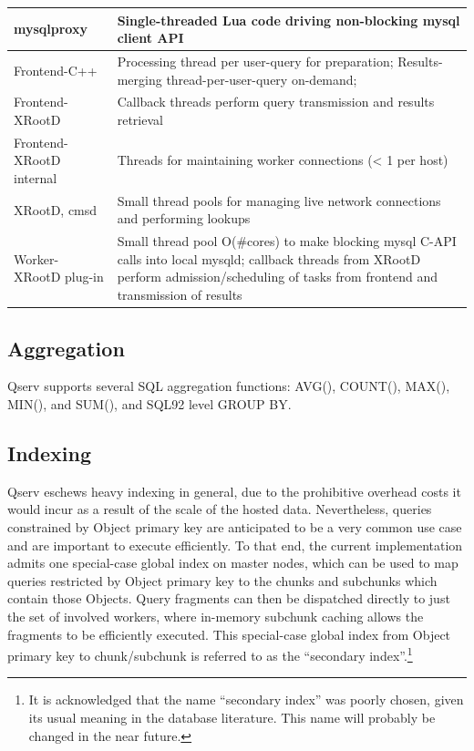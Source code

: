 \documentclass[DM,toc]{lsstdoc}
\begin{document}
\begin{longtable}{|l|p{}|}
\hline
mysqlproxy & Single-threaded Lua code driving non-blocking mysql client API \\ \hline
Frontend-C++ & Processing thread per user-query for preparation; Results-merging
thread-per-user-query on-demand; \\ \hline
Frontend-XRootD &
Callback threads perform query transmission and results retrieval \\ \hline
Frontend-XRootD internal &
Threads for maintaining worker connections (\textless{} 1 per
host) \\ \hline
XRootD, cmsd &
Small thread pools for managing live network connections and performing
lookups \\ \hline
Worker-XRootD plug-in &
Small thread pool O(\#cores) to make blocking mysql C-API calls into
local mysqld; callback threads from XRootD
perform admission/scheduling of tasks from frontend and transmission of
results \\ \hline
\hline
\end{longtable}

\subsection{Aggregation}\label{aggregation}

Qserv supports several SQL aggregation functions: AVG(), COUNT(), MAX(),
MIN(), and SUM(), and SQL92 level GROUP BY.

\subsection{Indexing}\label{indexing-1}

Qserv eschews heavy indexing in general, due to the prohibitive overhead costs
it would incur as a result of the scale of the hosted data. Nevertheless,
queries constrained by Object primary key are anticipated to be a very common
use case and are important to execute efficiently.  To that end, the current
implementation admits one special-case global index on master nodes, which can
be used to map queries restricted by Object primary key to the chunks and
subchunks which contain those Objects. Query fragments can then be dispatched
directly to just the set of involved workers, where in-memory subchunk caching
allows the fragments to be efficiently executed.  This special-case global
index from Object primary key to chunk/subchunk is referred to as the
``secondary index''.\footnote{It is acknowledged that the name ``secondary
index'' was poorly chosen, given its usual meaning in the database literature.  This
name will probably be changed in the near future.}
\end{document}
